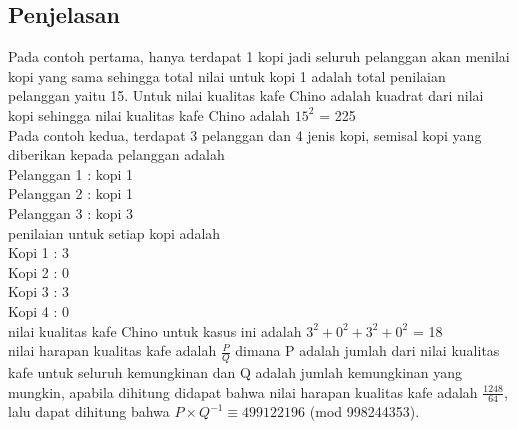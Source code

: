 \documentclass{article}
\begin{document}
\subsection*{Penjelasan}
Pada contoh pertama, hanya terdapat 1 kopi jadi seluruh pelanggan akan menilai kopi yang sama sehingga total nilai untuk kopi 1 adalah total penilaian pelanggan yaitu 15. Untuk nilai kualitas kafe Chino adalah kuadrat dari nilai kopi sehingga nilai kualitas kafe Chino adalah $15^2$ = 225\\

Pada contoh kedua, terdapat 3 pelanggan dan 4 jenis kopi, semisal kopi yang diberikan kepada pelanggan adalah\\
Pelanggan 1 : kopi 1\\
Pelanggan 2 : kopi 1\\
Pelanggan 3 : kopi 3\\
penilaian untuk setiap kopi adalah\\
Kopi 1 : 3\\
Kopi 2 : 0\\
Kopi 3 : 3\\
Kopi 4 : 0\\
nilai kualitas kafe Chino untuk kasus ini adalah $3^2 + 0^2 + 3^2 + 0^2$ = 18\\
nilai harapan kualitas kafe adalah $\frac{P}{Q}$ dimana P adalah jumlah dari nilai kualitas kafe untuk seluruh kemungkinan dan Q adalah jumlah kemungkinan yang mungkin, apabila dihitung didapat bahwa nilai harapan kualitas kafe adalah $\frac{1248}{64}$, lalu dapat dihitung bahwa $P \times Q^{-1} \equiv 499122196$ (mod 998244353).
\end{document}
